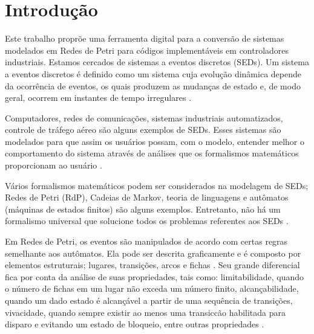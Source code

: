 \chapter{Introdu\c{c}\~ao}




Este trabalho propr\~oe uma ferramenta digital para a convers\~ao de sistemas modelados em Redes de Petri para c\'odigos implement\'aveis em controladores industriais.
Estamos cercados de sistemas a eventos discretos (SEDs). Um sistema a eventos discretos \'e definido como um sistema cuja evolu\c{c}\~ao din\^amica depende da ocorr\^encia de eventos, os quais produzem as mudan\c{c}as de estado e, de modo geral, ocorrem em instantes de tempo irregulares \cite{Montgomery2004}. 

Computadores, redes de comunica\c{c}\~oes, sistemas industriais automatizados, controle de tr\'afego a\'ereo s\~ao alguns exemplos de SEDs. Esses sistemas s\~ao modelados para que assim os usu\'arios possam, com o modelo, entender melhor o comportamento do sistema atrav\'es de an\'alises que os formalismos matem\'aticos proporcionam ao usu\'ario \cite{Wolfgang2013}.


V\'arios formalismos matem\'aticos podem ser considerados na modelagem de SEDs; Redes de Petri (RdP), Cadeias de Markov, teoria de linguagens e aut\^omatos (m\'aquinas de estados finitos) s\~ao alguns exemplos. Entretanto, n\~ao h\'a um formalismo universal que solucione todos os problemas referentes aos SEDs \cite{Montgomery2004}.


Em Redes de Petri, os eventos s\~ao manipulados de acordo com certas regras semelhante aos aut\^omatos. Ela pode ser descrita graficamente e \'e composto por elementos estruturais; lugares, transi\c{c}\~oes, arcos e fichas \cite{Cassandras2008}. Seu grande diferencial fica por conta da an\'alise de suas propriedades, tais como: limitabilidade, quando o n\'umero de fichas em um lugar n\~ao exceda um n\'umero finito, alcan\c{c}abilidade, quando um dado estado \'e alcan\c{c}\'avel a partir de uma sequ\^encia de transi\c{c}\~oes, vivacidade, quando sempre existir ao menos uma transic{c}\~ao habilitada para disparo e evitando um estado de bloqueio, entre outras propriedades \cite{Cassandras2008}.

